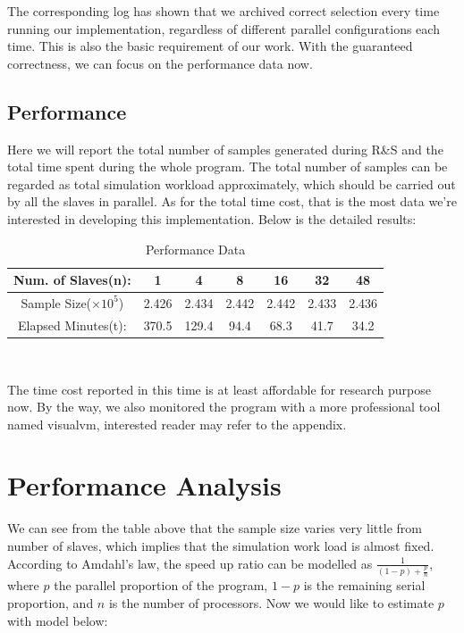\documentclass[12pt,a4paper]{report}
\begin{document}
The corresponding log has shown that we archived correct selection every time running our implementation, regardless of different parallel configurations each time. This is also the basic requirement of our work. With the guaranteed correctness, we can focus on the performance data now.

\subsection{Performance}

Here we will report the total number of samples generated during R\&S and the total time spent during the whole program. The total number of samples can be regarded as total simulation workload approximately, which should be carried out by all the slaves in parallel. As for the total time cost, that is the most data we're interested in developing this implementation. Below is the detailed results:

\begin{table}[ht]
\begin{center}
\begin{tabular}{|c|c|c|c|c|c|c|}
\hline
Num. of Slaves(n): & 1 & 4 & 8 & 16 & 32 & 48 \\
\hline
Sample Size($\times 10^5$) & 2.426 & 2.434 & 2.442 & 2.442 & 2.433 & 2.436\\
\hline
Elapsed Minutes(t): & 370.5 & 129.4 & 94.4 & 68.3 & 41.7 & 34.2 \\
\hline
\end{tabular} \\
\caption{Performance Data}
\end{center}
\end{table}

The time cost reported in this time is at least affordable for research purpose now. By the way, we also monitored the program with a more professional tool named visualvm, interested reader may refer to the appendix.

\section{Performance Analysis}

We can see from the table above that the sample size varies very little from number of slaves, which implies that the simulation work load is almost fixed. According to Amdahl's law, the speed up ratio can be modelled as $\frac{1}{(1 - p) + \frac{p}{n}}$, where $p$ the parallel proportion of the program, $1 - p$ is the remaining serial proportion, and $n$ is the number of processors. Now we would like to estimate $p$ with model below:
\end{document}
